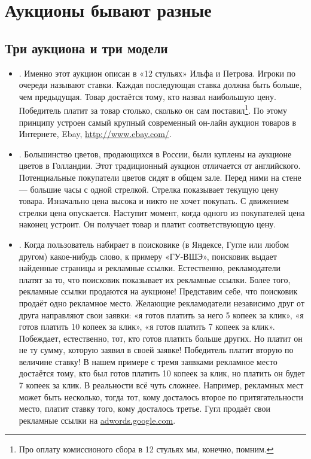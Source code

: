 \chapter{Аукционы бывают разные}




\section{Три аукциона и три модели}

\begin{itemize}

\item {}. Именно этот аукцион описан в «12 стульях» Ильфа и Петрова. Игроки по очереди называют ставки. Каждая последующая ставка должна быть больше, чем предыдущая. Товар достаётся тому, кто назвал наибольшую цену. Победитель платит за товар столько, сколько он сам поставил\footnote{Про оплату комиссионого сбора в 12 стульях мы, конечно, помним.}. По этому принципу устроен самый крупный современный он-лайн аукцион товаров в Интернете, Ebay, \url{http://www.ebay.com/}.

\item {}. Большинство цветов, продающихся в России, были куплены на аукционе цветов в Голландии. Этот традиционный аукцион отличается от английского. Потенциальные покупатели цветов сидят в общем зале. Перед ними на стене — большие часы с одной стрелкой. Стрелка показывает текущую цену товара. Изначально цена высока и никто не хочет покупать. С движением стрелки цена опускается. Наступит момент, когда одного из покупателей цена наконец устроит. Он получает товар и платит соответствующую цену.

\item {}. Когда пользователь набирает в поисковике (в Яндексе, Гугле или любом другом) какое-нибудь слово, к примеру «ГУ-ВШЭ», поисковик выдает найденные страницы и рекламные ссылки. Естественно, рекламодатели платят за то, что поисковик показывает их рекламные ссылки. Более того, рекламные ссылки продаются на аукционе! Представим себе, что поисковик продаёт одно рекламное место. Желающие рекламодатели независимо друг от друга направляют свои заявки: «я готов платить за него 5 копеек за клик», «я готов платить 10 копеек за клик», «я готов платить 7 копеек за клик». Побеждает, естественно, тот, кто готов платить больше других. Но платит он не ту сумму, которую заявил в своей заявке! Победитель платит вторую по величине ставку! В нашем примере с тремя заявками рекламное место достаётся тому, кто был готов платить 10 копеек за клик, но платить он будет 7 копеек за клик. В реальности всё чуть сложнее. Например, рекламных мест может быть несколько, тогда тот, кому досталось второе по притягательности место, платит ставку того, кому досталось третье. Гугл продаёт свои рекламные ссылки на \url{adwords.google.com}.


\end{itemize}
